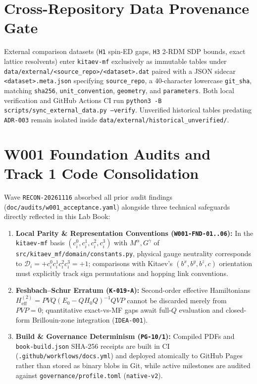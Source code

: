 \section{Cross-Repository Data Provenance Gate}
\label{sec:app_external_data_gate}

External comparison datasets (\texttt{H1} spin-ED gaps, \texttt{H3} 2-RDM SDP bounds, exact lattice resolvents) enter \texttt{kitaev-mf} exclusively as immutable tables under \texttt{data/external/<source\_repo>/<dataset>.dat} paired with a JSON sidecar \texttt{<dataset>.meta.json} specifying \texttt{source\_repo}, a 40-character lowercase \texttt{git\_sha}, matching \texttt{sha256}, \texttt{unit\_convention}, \texttt{geometry}, and \texttt{parameters}. Both local verification and GitHub Actions CI run \texttt{python3 -B scripts/sync\_external\_data.py --verify}. Unverified historical tables predating \texttt{ADR-003} remain isolated inside \texttt{data/external/historical\_unverified/}.

\section{W001 Foundation Audits and Track 1 Code Consolidation}
\label{sec:app_w001_track1}

Wave \texttt{RECON-20261116} absorbed all prior audit findings (\texttt{doc/audits/w001\_acceptance.yaml}) alongside three technical safeguards directly reflected in this Lab Book:
\begin{enumerate}
\item \textbf{Local Parity \& Representation Conventions (\texttt{W001-FND-01..06}):} In the \texttt{kitaev-mf} basis $(c_i^0, c_i^1, c_i^2, c_i^3)$ with $M^\alpha, G^\gamma$ of \texttt{src/kitaev\_mf/domain/constants.py}, physical gauge neutrality corresponds to $\mathcal{D}_i = +c_i^0 c_i^1 c_i^2 c_i^3 = +1$; comparisons with Kitaev's $(b^x,b^y,b^z,c)$ orientation must explicitly track sign permutations and hopping link conventions.
\item \textbf{Feshbach--Schur Erratum (\texttt{K-019-A}):} Second-order effective Hamiltonians $H_{\mathrm{eff}}^{(2)} = PV Q(E_0 - Q H_0 Q)^{-1} Q VP$ cannot be discarded merely from $PVP = 0$; quantitative exact-vs-MF gaps await full-$Q$ evaluation and closed-form Brillouin-zone integration (\texttt{IDEA-001}).
\item \textbf{Build \& Governance Determinism (\texttt{PG-10/1}):} Compiled PDFs and \texttt{book-build.json} SHA-256 receipts are built in CI (\texttt{.github/workflows/docs.yml}) and deployed atomically to GitHub Pages rather than stored as binary blobs in Git, while active milestones are audited against \texttt{governance/profile.toml} (\texttt{native-v2}).
\end{enumerate}
